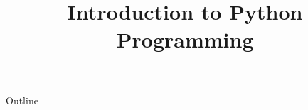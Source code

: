 \documentclass[xcolor=dvipsnames,compress,t,pdf]{beamer}
\title[\insertframenumber /\inserttotalframenumber]{Introduction to Python Programming}
\begin{document}
	\begin{frame}
	\titlepage
	\end{frame}
	
	\begin{frame}{Outline}
	    \tableofcontents
	\end{frame}

	
	
	
\end{document}
